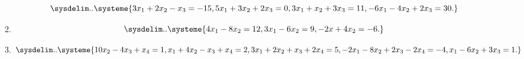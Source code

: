 \documentclass[english,12pt,a4paper]{scrartcl}
\begin{document}
\begin{enumerate}
\begin{multicols}{2}[\setlength{\columnseprule}{0pt}]
\begin{enumerate}
          \[
            \sysdelim..\systeme{
              3x_1 + 2x_2 - x_3 = -15,
              5x_1 + 3x_2 + 2x_3 = 0,
              3x_1 + x_2 + 3x_3 = 11,
              -6x_1 - 4x_2 + 2x_3 = 30.
            }
          \]
        \item
          \[
            \sysdelim..\systeme{
              4x_1 - 8x_2 = 12,
              3x_1 - 6x_2 = 9,
              -2x + 4x_2 = -6.
            }
          \]
        \item
          \[
            \sysdelim..\systeme{
              10x_2 - 4x_3 + x_4 = 1,
              x_1 + 4x_2 - x_3 + x_4 = 2,
              3x_1 + 2x_2 + x_3 + 2x_4 = 5,
              -2x_1 - 8x_2 + 2x_3 -2x_4 = -4,
              x_1 - 6x_2 + 3x_3 = 1.
            }
          \]
      \end{enumerate}
    \end{multicols}
\end{enumerate}
\end{document}
